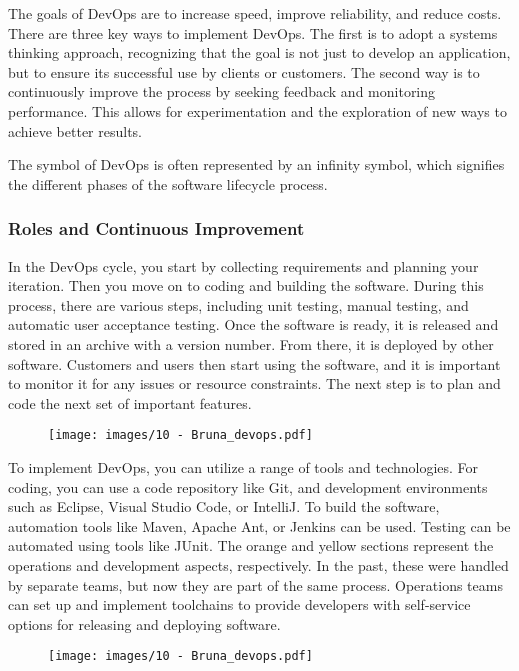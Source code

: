 The goals of DevOps are to increase speed, improve reliability, and
reduce costs. There are three key ways to implement DevOps. The first is
to adopt a systems thinking approach, recognizing that the goal is not
just to develop an application, but to ensure its successful use by
clients or customers. The second way is to continuously improve the
process by seeking feedback and monitoring performance. This allows for
experimentation and the exploration of new ways to achieve better
results.

The symbol of DevOps is often represented by an infinity symbol, which
signifies the different phases of the software lifecycle process.

\subsubsection{Roles and Continuous Improvement}

In the DevOps cycle, you start by collecting requirements and planning
your iteration. Then you move on to coding and building the software.
During this process, there are various steps, including unit testing,
manual testing, and automatic user acceptance testing. Once the software
is ready, it is released and stored in an archive with a version number.
From there, it is deployed by other software. Customers and users then
start using the software, and it is important to monitor it for any
issues or resource constraints. The next step is to plan and code the
next set of important features.

\begin{figure}[!h]
  \centering
  \texttt{[image: images/10 - Bruna\_devops.pdf]}
\end{figure}

To implement DevOps, you can utilize a range of tools and technologies.
For coding, you can use a code repository like Git, and development
environments such as Eclipse, Visual Studio Code, or IntelliJ. To build
the software, automation tools like Maven, Apache Ant, or Jenkins can be
used. Testing can be automated using tools like JUnit. The orange and
yellow sections represent the operations and development aspects,
respectively. In the past, these were handled by separate teams, but now
they are part of the same process. Operations teams can set up and
implement toolchains to provide developers with self-service options for
releasing and deploying software.

\begin{figure}[!h]
  \centering
  \texttt{[image: images/10 - Bruna\_devops.pdf]}
\end{figure}

